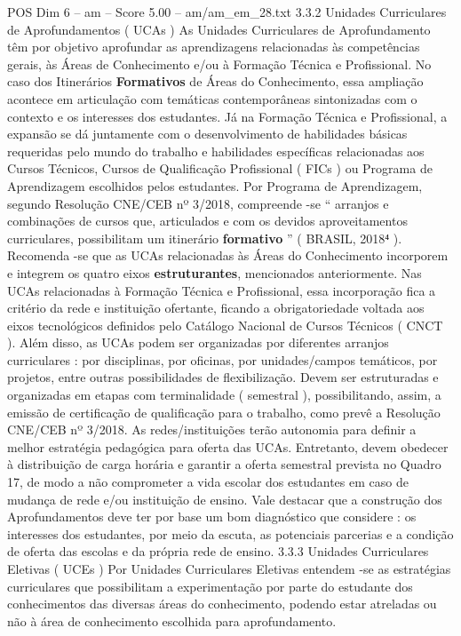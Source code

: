 \begin{textsample}{POS Dim 6 – am – Score 5.00 – am/am\_em\_28.txt}  \label{ex:f6_pos_269}
3.3.2 Unidades Curriculares de Aprofundamentos ( UCAs ) As Unidades Curriculares de Aprofundamento têm por objetivo aprofundar as aprendizagens relacionadas às competências gerais, às Áreas de Conhecimento e/ou à Formação Técnica e Profissional.
No caso dos Itinerários \textbf{Formativos} de Áreas do Conhecimento, essa ampliação acontece em articulação com temáticas contemporâneas sintonizadas com o contexto e os interesses dos estudantes.
Já na Formação Técnica e Profissional, a expansão se dá juntamente com o desenvolvimento de habilidades básicas requeridas pelo mundo do trabalho e habilidades específicas relacionadas aos Cursos Técnicos, Cursos de Qualificação Profissional ( FICs ) ou Programa de Aprendizagem escolhidos pelos estudantes.
Por Programa de Aprendizagem, segundo Resolução CNE/CEB nº 3/2018, compreende -se “ arranjos e combinações de cursos que, articulados e com os devidos aproveitamentos curriculares, possibilitam um itinerário \textbf{formativo} ” ( BRASIL, 2018⁴ ).
Recomenda -se que as UCAs relacionadas às Áreas do Conhecimento incorporem e integrem os quatro eixos \textbf{estruturantes}, mencionados anteriormente.
Nas UCAs relacionadas à Formação Técnica e Profissional, essa incorporação fica a critério da rede e instituição ofertante, ficando a obrigatoriedade voltada aos eixos tecnológicos definidos pelo Catálogo Nacional de Cursos Técnicos ( CNCT ).
Além disso, as UCAs podem ser organizadas por diferentes arranjos curriculares : por disciplinas, por oficinas, por unidades/campos temáticos, por projetos, entre outras possibilidades de flexibilização.
Devem ser estruturadas e organizadas em etapas com terminalidade ( semestral ), possibilitando, assim, a emissão de certificação de qualificação para o trabalho, como prevê a Resolução CNE/CEB nº 3/2018.
As redes/instituições terão autonomia para definir a melhor estratégia pedagógica para oferta das UCAs.
Entretanto, devem obedecer à distribuição de carga horária e garantir a oferta semestral prevista no Quadro 17, de modo a não comprometer a vida escolar dos estudantes em caso de mudança de rede e/ou instituição de ensino.
Vale destacar que a construção dos Aprofundamentos deve ter por base um bom diagnóstico que considere : os interesses dos estudantes, por meio da escuta, as potenciais parcerias e a condição de oferta das escolas e da própria rede de ensino. 3.3.3 Unidades Curriculares Eletivas ( UCEs ) Por Unidades Curriculares Eletivas entendem -se as estratégias curriculares que possibilitam a experimentação por parte do estudante dos conhecimentos das diversas áreas do conhecimento, podendo estar atreladas ou não à área de conhecimento escolhida para aprofundamento.

\end{textsample}
